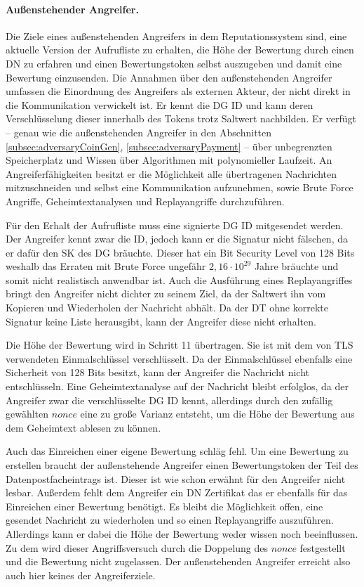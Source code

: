 \documentclass[
	fontsize=11pt,
	headings=small,
	parskip=half,           %
	bibliography=totoc,
	numbers=noenddot,       %
	open=any,               %
]{scrreprt}
\begin{document}
\paragraph{Außenstehender Angreifer.}
Die Ziele eines außenstehenden Angreifers in dem Reputationssystem sind, eine aktuelle Version der Aufrufliste zu erhalten, die Höhe der Bewertung durch einen DN zu erfahren und einen Bewertungstoken selbst auszugeben und damit eine Bewertung einzusenden. Die Annahmen über den außenstehenden Angreifer umfassen die Einordnung des Angreifers als externen Akteur, der nicht direkt in die Kommunikation verwickelt ist. Er kennt die DG ID und kann deren Verschlüsselung dieser innerhalb des Tokens trotz Saltwert nachbilden. Er verfügt -- genau wie die außenstehenden Angreifer in den Abschnitten \ref{subsec:adversaryCoinGen}, \ref{subsec:adversaryPayment} -- über unbegrenzten Speicherplatz und Wissen über Algorithmen mit polynomieller Laufzeit. An Angreiferfähigkeiten besitzt er die Möglichkeit alle übertragenen Nachrichten mitzuschneiden und selbst eine Kommunikation aufzunehmen, sowie Brute Force Angriffe, Geheimtextanalysen und Replayangriffe durchzuführen.

Für den Erhalt der Aufrufliste muss eine signierte DG ID mitgesendet werden. Der Angreifer kennt zwar die ID, jedoch kann er die Signatur nicht fälschen, da er dafür den SK des DG bräuchte. Dieser hat ein Bit Security Level von 128 Bits weshalb das Erraten mit Brute Force ungefähr $2,16\cdot10^{29}$ Jahre bräuchte und somit nicht realistisch anwendbar ist. Auch die Ausführung eines Replayangriffes bringt den Angreifer nicht dichter zu seinem Ziel, da der Saltwert ihn vom Kopieren und Wiederholen der Nachricht abhält. Da der DT ohne korrekte Signatur keine Liste herausgibt, kann der Angreifer diese nicht erhalten.

Die Höhe der Bewertung wird in Schritt 11 übertragen. Sie ist mit dem von TLS verwendeten Einmalschlüssel verschlüsselt. Da der Einmalschlüssel ebenfalls eine Sicherheit von 128 Bits besitzt, kann der Angreifer die Nachricht nicht entschlüsseln. Eine Geheimtextanalyse auf der Nachricht bleibt erfolglos, da der Angreifer zwar die verschlüsselte DG ID kennt, allerdings durch den zufällig gewählten $nonce$ eine zu große Varianz entsteht, um die Höhe der Bewertung aus dem Geheimtext ablesen zu können.

Auch das Einreichen einer eigene Bewertung schläg fehl. Um eine Bewertung zu erstellen braucht der außenstehende Angreifer einen Bewertungstoken der Teil des Datenpostfacheintrags ist. Dieser ist wie schon erwähnt für den Angreifer nicht lesbar. Außerdem fehlt dem Angreifer ein DN Zertifikat das er ebenfalls für das Einreichen einer Bewertung benötigt. Es bleibt die Möglichkeit offen, eine gesendet Nachricht zu wiederholen und so einen Replayangriffe auszuführen. Allerdings kann er dabei die Höhe der Bewertung weder wissen noch beeinflussen. Zu dem wird dieser Angriffsversuch durch die Doppelung des $nonce$ festgestellt und die Bewertung nicht zugelassen. Der außenstehenden Angreifer erreicht also auch hier keines der Angreiferziele.\\
\end{document}
